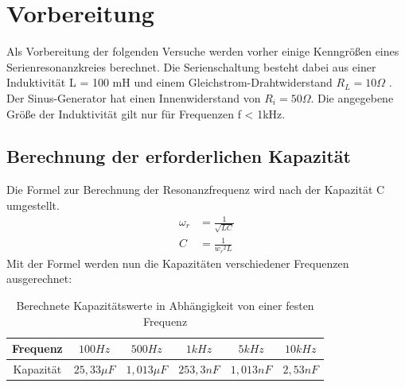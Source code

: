 \documentclass{article}
\begin{document}
\newpage
\thispagestyle{empty}

\tableofcontents


\newpage


\section{Vorbereitung}
Als Vorbereitung der folgenden Versuche werden vorher einige Kenngrößen eines Serienresonanzkreies berechnet.
Die Serienschaltung besteht dabei aus einer Induktivität L = 100 mH und einem Gleichstrom-Drahtwiderstand $R_L = 10 \Omega$ . Der Sinus-Generator
hat einen Innenwiderstand von $R_i = 50\Omega$. Die angegebene Größe der Induktivität gilt nur für Frequenzen f < 1kHz.

\subsection{Berechnung der erforderlichen Kapazität}
Die Formel zur Berechnung der Resonanzfrequenz wird nach der Kapazität C umgestellt.
\begin{align*}
  \omega_r & = \frac{1}{\sqrt{LC}} \\
  C        & = \frac{1}{{w_r}^2L}
\end{align*}
Mit der Formel werden nun die Kapazitäten verschiedener Frequenzen ausgerechnet:

\begin{table}[h]
  \begin{center}
    \begin{tabular}{|c|c|c|c|c|c|}
      \hline
      Frequenz  & $100 Hz$     & $500Hz$      & $1kHz$    & $5kHz$    & $10kHz$  \\
      \hline
      Kapazität & $25,33\mu F$ & $1,013\mu F$ & $253,3nF$ & $1,013nF$ & $2,53nF$ \\
      \hline
    \end{tabular}
    \caption{Berechnete Kapazitätswerte in Abhängigkeit von einer festen Frequenz}
    \label{tab:cFC}
  \end{center}
\end{table}
\end{document}
